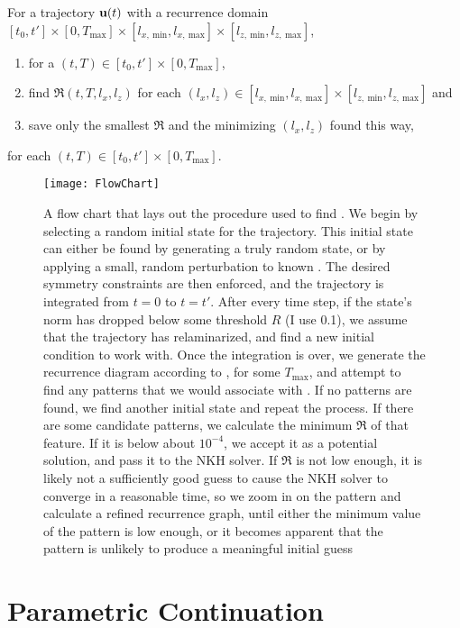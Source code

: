\begin{algorithm}\label{alg:recBroke}
For a trajectory $\mathbf{u}(t)$ with a recurrence domain   $[t_0,t']\times [0,T_{\textrm{max}}] \times [l_{x,~\textrm{min}},l_{x,~\textrm{max}}] \times [l_{z,~\textrm{min}},l_{z,~\textrm{max}}]$, 
\begin{enumerate}
\item for a $(t,T) \in [t_0,t']\times [0,T_{\textrm{max}}]$, 
\item find $\mathfrak{R}(t,T,l_x,l_z)$ for each $(l_x,l_z) \in  [l_{x,~\textrm{min}},l_{x,~\textrm{max}}] \times [l_{z,~\textrm{min}},l_{z,~\textrm{max}}]$ and 
\item save only the smallest $\mathfrak{R}$ and the minimizing $(l_x,l_z)$ found this way,   
\end{enumerate}
 for each $(t,T) \in [t_0,t']\times [0,T_{\textrm{max}}]$.
\end{algorithm}

\begin{figure}[h!]
\texttt{[image: FlowChart]}
\caption{A flow chart that lays out the procedure used to find \ecs. We begin by selecting a random initial state for the trajectory. This initial state can either be found by generating a truly random state, or by applying a small, random perturbation to known \ecs. The desired symmetry constraints are then enforced, and the trajectory is integrated from $t = 0$ to $t=t'$. After every time step, if the state's norm has dropped below some threshold $R$ (I use 0.1), we assume that the trajectory has relaminarized, and find a new initial condition to work with. Once the integration is over, we generate the recurrence diagram according to , for some $T_{\textrm{max}}$, and attempt to find any patterns that we would associate with \ecs. If no patterns are found, we find another initial state and repeat the process. If there are some candidate patterns, we calculate the minimum $\mathfrak{R}$ of that feature. If it is below about $10^{-4}$, we accept it as a potential solution, and pass it to the NKH solver. If $\mathfrak{R}$ is not low enough, it is likely not a sufficiently good guess to cause the NKH solver to converge in a reasonable time, so we zoom in on the pattern and calculate a refined recurrence graph, until either the minimum value of the pattern is low enough, or it becomes apparent that the pattern is unlikely to produce a meaningful initial guess}\label{fig:FlowChart} 
\end{figure}
 \clearpage
 \section{Parametric Continuation} 
 
